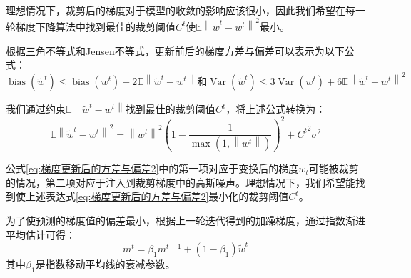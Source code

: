 理想情况下，裁剪后的梯度对于模型的收敛的影响应该很小，因此我们希望在每一轮梯度下降算法中找到最佳的裁剪阈值$C^{t}$使$\mathbb{E}\left\|\tilde{w}^{t}-w^{t}\right\|^{2}$最小。 

根据三角不等式和Jensen不等式，更新前后的梯度方差与偏差可以表示为以下公式：
\begin{equation}\label{eq:梯度更新后的方差与偏差}
\operatorname{bias}\left(\tilde{w}^{t}\right) \leq \operatorname{bias}\left(w^{t}\right)+2 \mathbb{E}\left\|\tilde{w}^{t}-w^{t}\right\| \text {和} \operatorname{Var}\left(\tilde{w}^{t}\right) \leq 3 \operatorname{Var}\left(w^{t}\right)+6 \mathbb{E}\left\|\tilde{w}^{t}-w^{t}\right\|^{2}
\end{equation}

我们通过约束$\mathbb{E}\left\|\tilde{w}^{t}-w^{t}\right\|$找到最佳的裁剪阈值$C^{t}$，将上述公式转换为：
\begin{equation}\label{eq:梯度更新后的方差与偏差2}
\mathbb{E}\left\|\tilde{w}^{t}-w^{t}\right\|^{2}=\left\|w^{t}\right\|^{2}\left(1-\frac{1}{\max \left(1,\left\|w^{t}\right\|\right)}\right)^{2}+{C^{t}}^{2} \sigma^{2}
\end{equation}

公式\ref{eq:梯度更新后的方差与偏差2}中的第一项对应于变换后的梯度$w_{t}$可能被裁剪的情况，第二项对应于注入到裁剪梯度中的高斯噪声。理想情况下，我们希望能找到使上述表达式\ref{eq:梯度更新后的方差与偏差2}最小化的裁剪阈值$C^{t}$。

为了使预测的梯度值的偏差最小，根据上一轮迭代得到的加躁梯度，通过指数渐进平均估计可得：
\begin{equation}\label{eq:梯度偏差估计}
m^{t}=\beta_{1} m^{t-1}+\left(1-\beta_{1}\right) \tilde{w}^{t}
\end{equation}
其中$\beta_{1}$是指数移动平均线的衰减参数。

